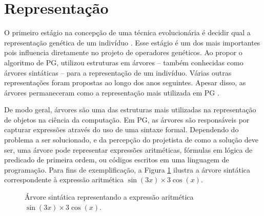 \section{Representação} \label{sec:representation}
O primeiro estágio na concepção de uma técnica evolucionária é decidir qual a representação genética de um indivíduo \cite{eiben2015}. Esse estágio é um dos mais importantes pois influencia diretamente no projeto de operadores genéticos. Ao propor o algoritmo de PG,  utilizou estruturas em árvores -- também conhecidas como árvores sintáticas -- para a representação de um indivíduo. Várias outras representações foram propostas ao longo dos anos seguintes. Apesar disso, as árvores permaneceram como a representação mais utilizada em PG \cite{poli2008}.

De modo geral, árvores são uma das estruturas mais utilizadas na representação de objetos na ciência da computação. Em PG, as árvores são responsáveis por capturar expressões através do uso de uma sintaxe formal. Dependendo do problema a ser solucionado, e da percepção do projetista de como a solução deve ser, uma árvore pode representar expressões aritméticas, fórmulas em lógica de predicado de primeira ordem, ou códigos escritos em uma linguagem de programação. Para fins de exemplificação, a Figura \ref{fig:tree-example} ilustra a árvore sintática correspondente à expressão aritmética $\sin(3x) \times 3\cos(x)$.

\begin{figure}[H]
    \caption{Árvore sintática representando a expressão aritmética $\sin(3x) \times 3\cos(x)$.}
    \label{fig:tree-example}
    \begin{center}
    \end{center}
    \begin{center}
    \end{center}
\end{figure}

